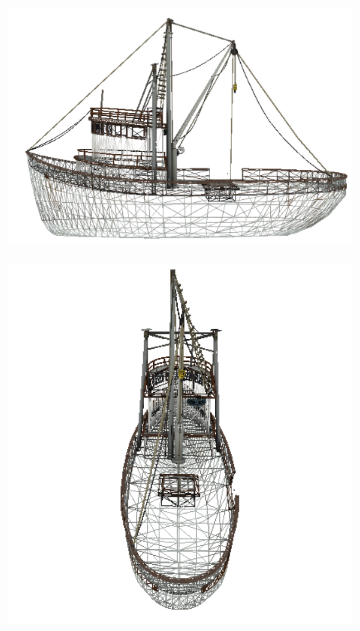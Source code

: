 \documentclass{report}
\begin{document}
\begin{figure}[H]
\begin{subfigure}{.3\textwidth}
  \centering
  \includegraphics[width=.8\linewidth]{images/ship_sketch_1.pdf}
  \label{fig:ship_sketch_1}
\end{subfigure}%
\begin{subfigure}{.3\textwidth}
  \centering
  \includegraphics[width=.8\linewidth]{images/ship_sketch_2.pdf}
  \label{fig:ship_sketch_2}
\end{subfigure}
\begin{subfigure}{.25\textwidth}
  \centering

\end{subfigure}
\end{figure}
\end{document}
